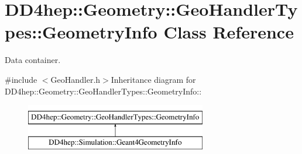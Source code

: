 \hypertarget{class_d_d4hep_1_1_geometry_1_1_geo_handler_types_1_1_geometry_info}{
\section{DD4hep::Geometry::GeoHandlerTypes::GeometryInfo Class Reference}
\label{class_d_d4hep_1_1_geometry_1_1_geo_handler_types_1_1_geometry_info}
}


Data container.  


{\ttfamily \#include $<$GeoHandler.h$>$}Inheritance diagram for DD4hep::Geometry::GeoHandlerTypes::GeometryInfo::\begin{figure}[H]
\begin{center}
\leavevmode
\includegraphics[height=2cm]{class_d_d4hep_1_1_geometry_1_1_geo_handler_types_1_1_geometry_info}
\end{center}
\end{figure}
